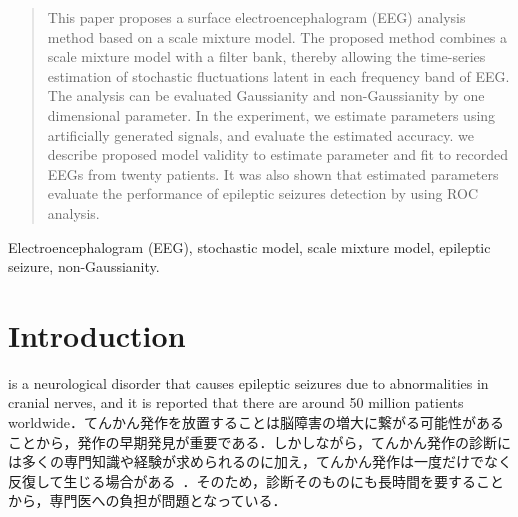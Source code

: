 \documentclass[journal]{IEEEtran}
\begin{document}
\begin{abstract}
This paper proposes a surface electroencephalogram (EEG) analysis method based on a scale mixture model. The proposed method combines a scale mixture model with a filter bank, thereby allowing the time-series estimation of stochastic fluctuations latent in each frequency band of EEG. The analysis can be evaluated Gaussianity and non-Gaussianity by  one dimensional parameter.
In the experiment, we estimate parameters using artificially generated signals, and evaluate the estimated accuracy. we describe proposed model validity to estimate parameter and fit to  recorded EEGs from twenty patients.
It was also shown that estimated parameters evaluate the performance of epileptic seizures detection by using ROC analysis.

\end{abstract}

\begin{IEEEkeywords}
Electroencephalogram (EEG), stochastic model, scale mixture model, epileptic seizure, non-Gaussianity.
\end{IEEEkeywords}



%
\IEEEpeerreviewmaketitle



\section{Introduction}
%
%
%
%
 is a neurological disorder that causes epileptic seizures due to abnormalities in cranial nerves, and it is reported that there are around 50 million patients worldwide\cite{WHO}．てんかん発作を放置することは脳障害の増大に繋がる可能性があることから，発作の早期発見が重要である．しかしながら，てんかん発作の診断には多くの専門知識や経験が求められるのに加え，てんかん発作は一度だけでなく反復して生じる場合がある~\cite{ep2011}．そのため，診断そのものにも長時間を要することから，専門医への負担が問題となっている．
\end{document}
